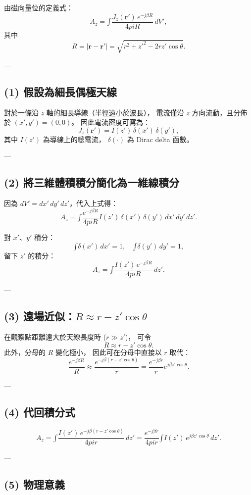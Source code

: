 \documentclass{article}
\def\pi{pi}%
\def\int{\text{∫}}%
\begin{document}
由磁向量位的定義式：
\[
A_z = \int \frac{J_z(\mathbf{r}')\, e^{-j\beta R}}{4\pi R}\, dV',
\]
其中
\[
R = |\mathbf{r} - \mathbf{r}'| = \sqrt{r^2 + z'^2 - 2r z'\cos\theta}.
\]

---

\subsection*{(1) 假設為細長偶極天線}

對於一條沿 $z$ 軸的細長導線（半徑遠小於波長），
電流僅沿 $z$ 方向流動，且分佈於 $(x',y')=(0,0)$。
因此電流密度可寫為：
\[
J_z(\mathbf{r}') = I(z')\,\delta(x')\,\delta(y'),
\]
其中 $I(z')$ 為導線上的總電流，
$\delta(\cdot)$ 為 Dirac delta 函數。

---

\subsection*{(2) 將三維體積積分簡化為一維線積分}

因為 $dV' = dx'\,dy'\,dz'$，代入上式得：
\[
A_z = \int \frac{e^{-j\beta R}}{4\pi R} I(z')\,\delta(x')\,\delta(y')\, dx'\,dy'\,dz'.
\]

對 $x'$、$y'$ 積分：
\[
\int \delta(x')\,dx' = 1, \quad
\int \delta(y')\,dy' = 1,
\]
留下 $z'$ 的積分：
\[
A_z = \int \frac{I(z')\, e^{-j\beta R}}{4\pi R}\, dz'.
\]

---

\subsection*{(3) 遠場近似：$R \approx r - z'\cos\theta$}

在觀察點距離遠大於天線長度時 ($r \gg z'$)，
可令
\[
R \approx r - z'\cos\theta.
\]
此外，分母的 $R$ 變化極小，
因此可在分母中直接以 $r$ 取代：
\[
\frac{e^{-j\beta R}}{R}
\approx
\frac{e^{-j\beta (r - z'\cos\theta)}}{r}
= \frac{e^{-j\beta r}}{r} e^{j\beta z'\cos\theta}.
\]

---

\subsection*{(4) 代回積分式}

\[
A_z = \int \frac{I(z')\, e^{-j\beta (r - z'\cos\theta)}}{4\pi r}\, dz'
= \frac{e^{-j\beta r}}{4\pi r}
\int I(z')\, e^{j\beta z'\cos\theta}\, dz'.
\]

---

\subsection*{(5) 物理意義}
\end{document}

